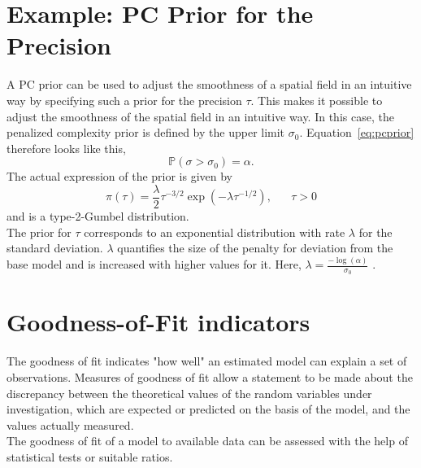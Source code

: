 \section{Example: PC Prior for the Precision}
A PC prior can be used to adjust the smoothness of a spatial field in an intuitive way by specifying such a prior for the precision $\tau$. This makes it possible to adjust the smoothness of the spatial field in an intuitive way. In this case, the penalized complexity prior is defined by the upper limit $\sigma_0$. Equation~\ref{eq:pcprior} therefore looks like this,
\begin{equation}\label{pcprec}
    \mathbb{P}\left(\sigma > \sigma_0\right)=\alpha.
\end{equation}
The actual expression of the prior is given by
\begin{equation}\label{eq:pc_prior_prec}
    \pi\left(\tau\right)=\frac{\lambda}{2}\tau^{-3/2}\exp\left(-\lambda\tau^{-1/2}\right),\hspace{20pt}\tau>0
\end{equation}
and is a type-2-Gumbel distribution. \\
The prior for $\tau$ corresponds to an exponential distribution with rate $\lambda$ for the standard deviation. $\lambda$ quantifies the size of the penalty for deviation from the base model and is increased with higher values for it. Here, $\lambda=\frac{-\log\left(\alpha\right)}{\sigma_0}$ \autocite[][]{sorbye2017penalised}.
\clearpage
\section{Goodness-of-Fit indicators}\label{sec:performance}
The goodness of fit indicates "how well" an estimated model can explain a set of observations. Measures of goodness of fit allow a statement to be made about the discrepancy between the theoretical values of the random variables under investigation, which are expected or predicted on the basis of the model, and the values actually measured. \\
The goodness of fit of a model to available data can be assessed with the help of statistical tests or suitable ratios.
